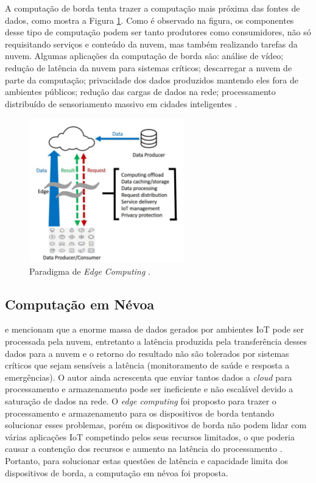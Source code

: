 A computação de borda tenta trazer a computação mais próxima das fontes de
dados, como mostra a Figura \ref{edge-computing}. Como é observado na figura, os
componentes desse tipo de computação podem ser tanto produtores como
consumidores, não só requisitando serviços e conteúdo da nuvem, mas também
realizando tarefas da nuvem.
Algumas aplicações da computação de borda são: análise de vídeo;
redução de latência da nuvem para sistemas críticos;
descarregar a nuvem de parte da computação;
privacidade dos dados produzidos mantendo eles fora de ambientes públicos;
redução das cargas de dados na rede;
processamento distribuído de sensoriamento massivo em cidades inteligentes \cite{Shi2016}.

\begin{figure}[ht]
\centering
\includegraphics[width=0.6\textwidth]{figuras/edge-computing.png}
\caption{Paradigma de \emph{Edge Computing} \cite{Shi2016}.}
\label{edge-computing}
\end{figure}

\subsection{Computação em Névoa}

 e 
mencionam que a enorme massa de dados gerados por ambientes IoT pode ser
processada pela nuvem, entretanto a latência produzida pela transferência desses
dados para a nuvem e o retorno do resultado não são tolerados por sistemas
críticos que sejam sensíveis a latência (monitoramento de saúde e resposta a
emergências). O autor ainda acrescenta que enviar tantos dados a \emph{cloud}
para processamento e armazenamento pode ser ineficiente e não escalável devido a
saturação de dados na rede. O \emph{edge computing} foi proposto para trazer o
processamento e armazenamento para os dispositivos de borda tentando solucionar
esses problemas, porém os dispositivos de borda não podem lidar com várias
aplicações IoT competindo pelos seus recursos limitados, o que poderia causar a
contenção dos recursos e aumento na latência do processamento
\cite{Dastjerdi2016}. Portanto, para solucionar estas questões de latência e
capacidade limita dos dispositivos de borda, a computação em névoa foi proposta.

